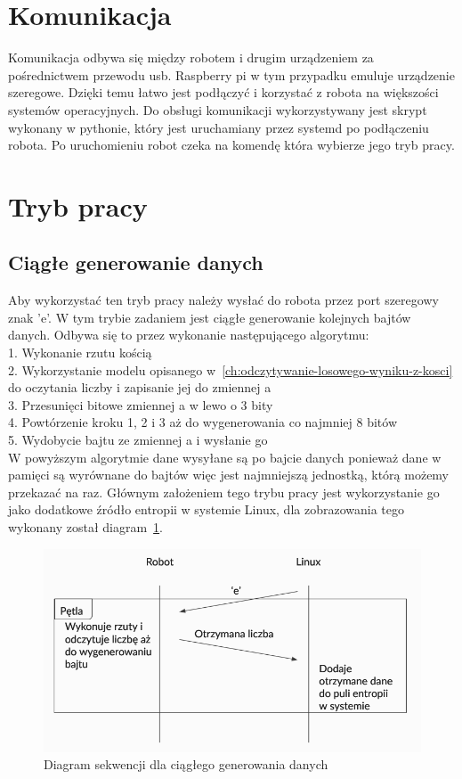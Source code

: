 \section{Komunikacja} %

Komunikacja odbywa się między robotem i drugim urządzeniem za pośrednictwem przewodu usb.
Raspberry pi w tym przypadku emuluje urządzenie szeregowe.
Dzięki temu łatwo jest podłączyć i korzystać z robota na większości systemów operacyjnych. 
Do obsługi komunikacji wykorzystywany jest skrypt wykonany w pythonie, który jest uruchamiany 
przez systemd po podłączeniu robota. Po uruchomieniu robot czeka na komendę która wybierze jego tryb pracy. 

\section{Tryb pracy} 

\subsection{Ciągłe generowanie danych}
Aby wykorzystać ten tryb pracy należy wysłać do robota przez port szeregowy znak 'e'.
W tym trybie zadaniem jest ciągłe generowanie kolejnych bajtów danych.
Odbywa się to przez wykonanie następującego algorytmu:\\
1. Wykonanie rzutu kością \\
2. Wykorzystanie modelu opisanego w~\ref{ch:odczytywanie-losowego-wyniku-z-kosci} do oczytania liczby i zapisanie jej do zmiennej a \\
3. Przesunięci bitowe zmiennej a w lewo o 3 bity \\
4. Powtórzenie kroku 1, 2 i 3 aż do wygenerowania co najmniej 8 bitów \\
5. Wydobycie bajtu ze zmiennej a i wysłanie go \\

W powyższym algorytmie dane wysyłane są po bajcie danych ponieważ dane w pamięci 
są wyrównane do bajtów więc jest najmniejszą jednostką, którą możemy przekazać na raz.
Głównym założeniem tego trybu pracy jest wykorzystanie go jako dodatkowe źródło entropii w systemie Linux, 
dla zobrazowania tego wykonany został diagram~\ref{fig:interface_a}.

\begin{figure}[H]
    \centering
    \includegraphics[width=0.5\linewidth]{chapters/05-Przetwarzanie Wyniku/figures/InterfaceA}
    \caption{Diagram sekwencji dla ciągłego generowania danych}
    \label{fig:interface_a}
\end{figure}

